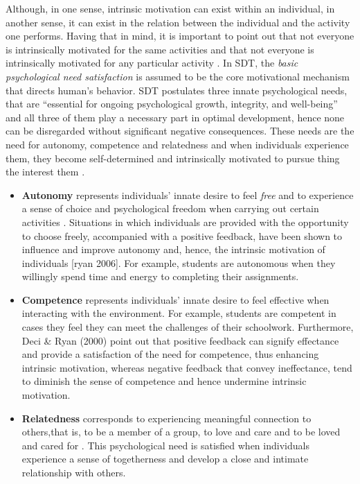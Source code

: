 Although, in one sense, intrinsic motivation can exist within an individual, in another sense, it can exist in the relation between the individual and the activity one performs. Having that in mind, it is important to point out that not everyone is intrinsically motivated for the same activities and that not everyone is intrinsically motivated for any particular activity \cite{ryan2000intrinsic}. In SDT, the \textit{basic psychological need satisfaction} is assumed to be the core motivational mechanism that directs human's behavior. SDT postulates three innate psychological needs, that are ``essential for ongoing psychological growth, integrity, and well-being'' and all three of them play a necessary part in optimal development, hence none can be disregarded without significant negative consequences. These needs are the need for autonomy, competence and relatedness and when individuals experience them, they become self-determined and intrinsically motivated to pursue thing the interest them \cite{deci2000and}. %
\begin{itemize}
\item \textbf{Autonomy} represents individuals' innate desire to feel \textit{free} and to experience a sense of choice and psychological freedom when carrying out certain activities \cite{deci2000and}. Situations in which individuals are provided with the opportunity to choose freely, accompanied with a positive feedback, have been shown to influence and improve autonomy and, hence, the intrinsic motivation of individuals [ryan 2006]. For example, students  are  autonomous when they willingly spend time and energy to completing their assignments. 
\item \textbf{Competence} represents individuals' innate desire to feel effective when interacting with the environment. For example, students are competent in cases they feel they can meet the challenges of their schoolwork. Furthermore, Deci \& Ryan (2000) point out that positive feedback can signify effectance and provide a satisfaction of the need for competence, thus enhancing intrinsic motivation, whereas negative feedback that convey ineffectance, tend  to
diminish the sense of competence and hence undermine intrinsic motivation. 


\item \textbf{Relatedness} corresponds to experiencing meaningful connection to others,that is, to be a member of a group, to love and care and to be loved and cared for \cite{broeck2010capturing}. This psychological need is satisfied when individuals experience a sense of togetherness and develop a close and intimate relationship with others. 
\end{itemize}

